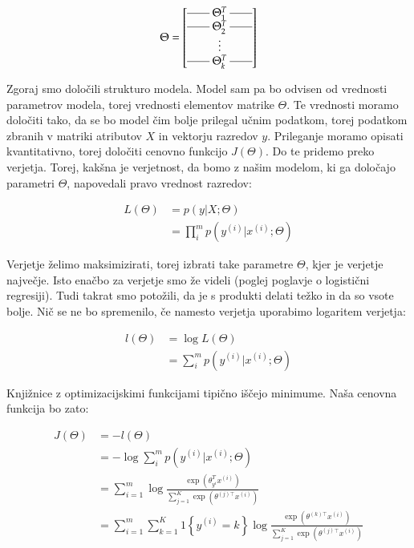 $$
\Theta =
\begin{bmatrix}
  \myrule~\Theta_1^T~\myrule \\ 
  \myrule~\Theta_2^T~\myrule \\
  \vdots \\
  \myrule~\Theta_k^T~\myrule
\end{bmatrix}
$$

Zgoraj smo določili strukturo modela. Model sam pa bo odvisen od vrednosti parametrov modela, torej vrednosti elementov matrike $\Theta$. Te vrednosti moramo določiti tako, da se bo model čim bolje prilegal učnim podatkom, torej podatkom zbranih v matriki atributov $X$ in vektorju razredov $y$. Prileganje moramo opisati kvantitativno, torej določiti cenovno funkcijo $J(\Theta)$. Do te pridemo preko verjetja. Torej, kakšna je verjetnost, da bomo z našim modelom, ki ga določajo parametri $\Theta$, napovedali pravo vrednost razredov:

\begin{equation}
  \begin{split}
    L(\Theta) & = p(y|X;\Theta) \\
    & = \prod_i^m p(y^{(i)}|x^{(i)};\Theta)
  \end{split}
\end{equation}

Verjetje želimo maksimizirati, torej izbrati take parametre $\Theta$, kjer je verjetje največje. Isto enačbo za verjetje smo že videli (poglej poglavje o logistični regresiji). Tudi takrat smo potožili, da je s produkti delati težko in da so vsote bolje. Nič se ne bo spremenilo, če namesto verjetja uporabimo logaritem verjetja:

\begin{equation}
  \begin{split}
    l(\Theta) & = \log L(\Theta) \\
    & = \sum_i^m p(y^{(i)}|x^{(i)};\Theta)
  \end{split}
\end{equation}

Knjižnice z optimizacijskimi funkcijami tipično iščejo minimume. Naša cenovna funkcija bo zato:

\begin{equation}
  \begin{split}
    J(\Theta) & = -l(\Theta) \\
    & = - \log \sum_i^m p(y^{(i)}|x^{(i)};\Theta) \\
    & = \sum_{i=1}^{m} \log\frac{\exp(\theta_{y^{i}}^T x^{(i)})}{\sum_{j=1}^K \exp(\theta^{(j)\top} x^{(i)})} \\
    & = \sum_{i=1}^{m} \sum_{k=1}^{K}  1\left\{y^{(i)} = k\right\} \log \frac{\exp(\theta^{(k)\top} x^{(i)})}{\sum_{j=1}^K \exp(\theta^{(j)\top} x^{(i)})}
  \end{split}
\end{equation}


